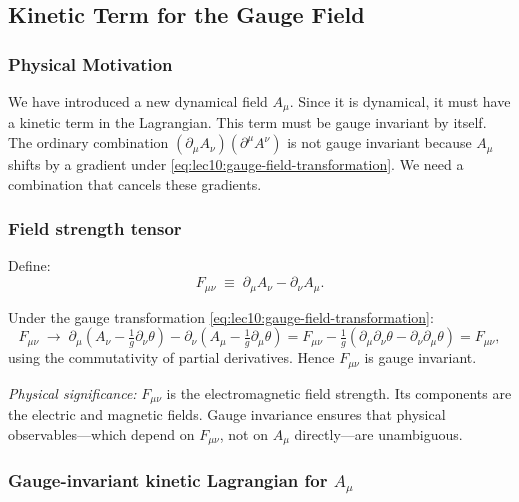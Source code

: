 \documentclass[../main.tex]{subfiles}
\begin{document}
\subsection*{Kinetic Term for the Gauge Field}

\subsubsection*{Physical Motivation}

We have introduced a new dynamical field $A_\mu$.  Since it is dynamical, it must have a kinetic term in the Lagrangian.  This term must be gauge invariant by itself.  The ordinary combination $(\partial_\mu A_\nu)(\partial^\mu A^\nu)$ is not gauge invariant because $A_\mu$ shifts by a gradient under \eqref{eq:lec10:gauge-field-transformation}.  We need a combination that cancels these gradients.

\subsubsection*{Field strength tensor}

Define:
\begin{equation}
  \boxed{
  F_{\mu\nu} \;\equiv\; \partial_\mu A_\nu - \partial_\nu A_\mu.}
  \label{eq:lec10:field-strength}
\end{equation}

Under the gauge transformation \eqref{eq:lec10:gauge-field-transformation}:
\begin{equation}
  F_{\mu\nu}
  \;\longrightarrow\;
  \partial_\mu\!\left(A_\nu - \tfrac{1}{g}\partial_\nu\theta\right)
  - \partial_\nu\!\left(A_\mu - \tfrac{1}{g}\partial_\mu\theta\right)
  = F_{\mu\nu} - \tfrac{1}{g}(\partial_\mu\partial_\nu\theta - \partial_\nu\partial_\mu\theta)
  = F_{\mu\nu},
  \label{eq:lec10:fmunu-invariant}
\end{equation}
using the commutativity of partial derivatives.  Hence $F_{\mu\nu}$ is gauge invariant.

\textit{Physical significance:} $F_{\mu\nu}$ is the electromagnetic field strength.  Its components are the electric and magnetic fields.  Gauge invariance ensures that physical observables—which depend on $F_{\mu\nu}$, not on $A_\mu$ directly—are unambiguous.

\subsubsection*{Gauge-invariant kinetic Lagrangian for $A_\mu$}
\end{document}
